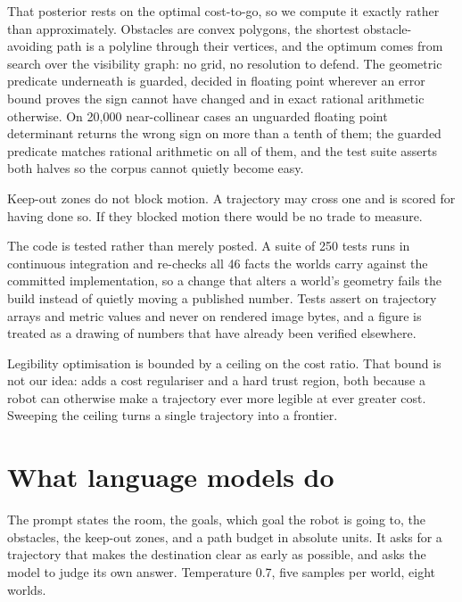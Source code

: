 \documentclass[sigconf,nonacm]{acmart}
\begin{document}
That posterior rests on the optimal cost-to-go, so we compute it exactly
rather than approximately. Obstacles are convex polygons, the shortest
obstacle-avoiding path is a polyline through their vertices, and the
optimum comes from search over the visibility graph: no grid, no
resolution to defend. The geometric predicate underneath is guarded, decided
in floating point wherever an error bound proves the sign cannot have
changed and in exact rational arithmetic otherwise. On 20{,}000
near-collinear cases an unguarded floating point determinant returns the
wrong sign on more than a tenth of them; the guarded predicate matches
rational arithmetic on all of them, and the test suite asserts both
halves so the corpus cannot quietly become easy.

Keep-out zones do not block motion. A trajectory may cross one and is
scored for having done so. If they blocked motion there would be no
trade to measure.

The code is tested rather than merely posted. A suite of 250 tests runs
in continuous integration and re-checks all 46 facts the worlds carry
against the committed implementation, so a change that alters a world's
geometry fails the build instead of quietly moving a published number.
Tests assert on trajectory arrays and metric values and never on rendered
image bytes, and a figure is treated as a drawing of numbers that have
already been verified elsewhere.

Legibility optimisation is bounded by a ceiling on the cost ratio. That
bound is not our idea: \cite{dragan2013legibility} adds a cost
regulariser and \cite{dragan2013generating} a hard trust region, both
because a robot can otherwise make a trajectory ever more legible at ever
greater cost. Sweeping the ceiling turns a single trajectory into a
frontier.

\section{What language models do}

The prompt states the room, the goals, which goal the robot is going to,
the obstacles, the keep-out zones, and a path budget in absolute units.
It asks for a trajectory that makes the destination clear as early as
possible, and asks the model to judge its own answer. Temperature 0.7,
five samples per world, eight worlds.

\begin{table}[t]
\centering
\small

\caption{Counts at a stated path budget of 25 per cent. Of 120 decodes,
116 claimed to be legible, including the 25 that were not physically
possible. All four refusals came from one model, and none of them
survives raising the stated budget to 2.00.}
\label{tab:models}
\end{table}
\end{document}
